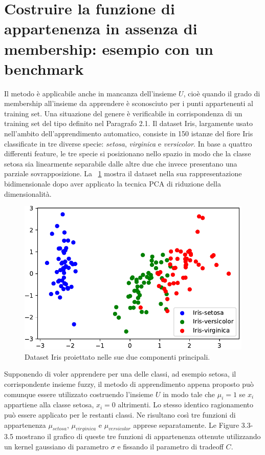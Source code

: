 \documentclass [11pt,a4paper,twoside,openright] {book}
\begin{document}
\section{Costruire la funzione di appartenenza in assenza di membership: esempio con un benchmark}
Il metodo è applicabile anche in mancanza dell'insieme $U$, cioè quando il grado di membership all'insieme da apprendere è sconosciuto per i punti appartenenti al training set. Una situazione del genere è verificabile in corrispondenza di un training set del tipo definito nel Paragrafo 2.1. Il dataset Iris\cite{fisher1936use}, largamente usato nell'ambito dell'apprendimento automatico, consiste in 150 istanze del fiore Iris classificate in tre diverse specie: \textit{setosa}, \textit{virginica} e \textit{versicolor}. In base a quattro differenti feature, le tre specie si posizionano nello spazio in modo che la classe setosa sia linearmente separabile dalle altre due che invece presentano una parziale sovrapposizione. La \figurename~\ref{datasetiris} mostra il dataset nella sua rappresentazione bidimensionale dopo aver applicato la tecnica PCA\cite{abdi2010principal} di riduzione della dimensionalità.
\begin{figure}[H]
\centering
\includegraphics[scale=0.6]{figure/datasetiris.pdf}
\caption{Dataset Iris proiettato nelle sue due componenti principali. \label{datasetiris}}
\end{figure}
Supponendo di voler apprendere per una delle classi, ad esempio setosa, il corrispondente insieme fuzzy, il metodo di apprendimento appena proposto può comunque essere utilizzato costruendo l'insieme $U$ in modo tale che $\mu_i = 1$ se $x_i$ appartiene alla classe setosa, $x_i = 0$ altrimenti. Lo stesso identico ragionamento può essere applicato per le restanti classi. Ne risultano così tre funzioni di appartenenza $\mu_{setosa}$, $\mu_{virginica}$ e $\mu_{versicolor}$ apprese separatamente. Le Figure 3.3-3.5 mostrano il grafico di queste tre funzioni di appartenenza ottenute utilizzando un kernel gaussiano di parametro $\sigma$ e fissando il parametro di tradeoff $C$.
\end{document}

